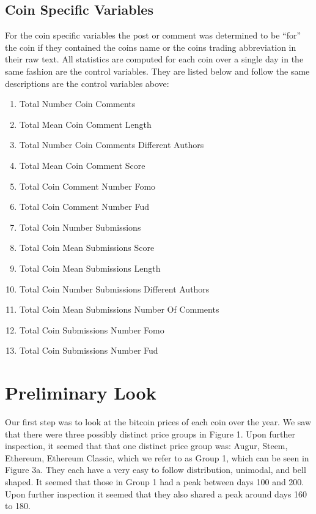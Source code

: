 \documentclass[12pt]{article}
\begin{document}
\subsection{Coin Specific Variables}


\indent \indent For the coin specific variables the post or comment was determined to be ``for'' the coin if they contained the coins name or the coins trading abbreviation in their raw text. All statistics are computed for each coin over a single day in the same fashion are the control variables. They are listed below and follow the same descriptions are the control variables above:
\begin{multicols}{2}
\begin{enumerate}
\item Total Number Coin Comments
\item Total Mean Coin Comment Length
\item Total Number Coin Comments Different Authors
\item Total Mean Coin Comment Score
\item Total Coin Comment Number Fomo
\item Total Coin Comment Number Fud
\item Total Coin Number Submissions
\item Total Coin Mean Submissions Score
\item Total Coin Mean Submissions Length
\item Total Coin Number Submissions Different Authors
\item Total Coin Mean Submissions Number Of Comments
\item Total Coin Submissions Number Fomo
\item Total Coin Submissions Number Fud
\end{enumerate}
\end{multicols}

\section{Preliminary Look}
\indent \indent Our first step was to look at the bitcoin prices of each coin over the year. We saw that there were three possibly distinct price groups in Figure 1. Upon further inspection, it seemed that that one distinct price group was: Augur, Steem, Ethereum, Ethereum Classic, which we refer to as Group 1, which can be seen in Figure 3a. They each have a very easy to follow distribution, unimodal, and bell shaped. It seemed that those in Group 1 had a peak between days 100 and 200. Upon further inspection it seemed that they also shared a peak around days 160 to 180. 
\end{document}
